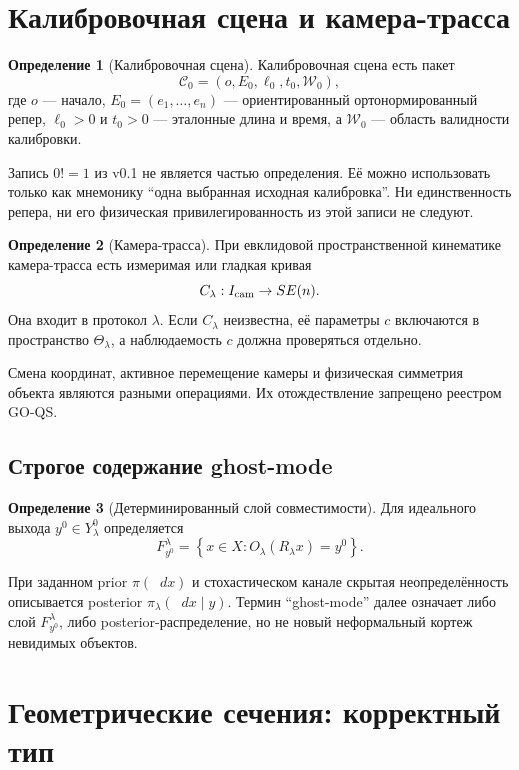 \documentclass[11pt,a4paper]{article}
\theoremstyle{definition}
\newtheorem{definition}{Определение}[section]
\theoremstyle{plain}
\theoremstyle{remark}
\newcommand{\dd}{\mathop{}\!d}
\newcommand{\set}[1]{\left\{#1\right\}}
\begin{document}
\section{Калибровочная сцена и камера-трасса}

\begin{definition}[Калибровочная сцена]
Калибровочная сцена есть пакет
\[
\mathcal C_0=(o,E_0,\ell_0,t_0,\mathcal W_0),
\]
где $o$ --- начало, $E_0=(e_1,\ldots,e_n)$ --- ориентированный
ортонормированный репер, $\ell_0>0$ и $t_0>0$ --- эталонные длина и время,
а $\mathcal W_0$ --- область валидности калибровки.
\end{definition}

Запись $0!=1$ из v0.1 не является частью определения. Её можно использовать
только как мнемонику ``одна выбранная исходная калибровка''. Ни единственность
репера, ни его физическая привилегированность из этой записи не следуют.

\begin{definition}[Камера-трасса]
При евклидовой пространственной кинематике камера-трасса есть измеримая или
гладкая кривая
\[
C_\lambda:I_{\rm cam}\to SE(n).
\]
Она входит в протокол $\lambda$. Если $C_\lambda$ неизвестна, её параметры
$c$ включаются в пространство $\Theta_\lambda$, а наблюдаемость $c$ должна
проверяться отдельно.
\end{definition}

Смена координат, активное перемещение камеры и физическая симметрия объекта
являются разными операциями. Их отождествление запрещено реестром GO-QS.

\subsection{Строгое содержание ghost-mode}

\begin{definition}[Детерминированный слой совместимости]
Для идеального выхода $y^0\in Y_\lambda^0$ определяется
\[
F_{y^0}^{\lambda}
=\set{x\in X:O_\lambda(R_\lambda x)=y^0}.
\]
\end{definition}

При заданном prior $\pi(\dd x)$ и стохастическом канале скрытая
неопределённость описывается posterior $\pi_\lambda(\dd x\mid y)$.
Термин ``ghost-mode'' далее означает либо слой $F_{y^0}^{\lambda}$, либо
posterior-распределение, но не новый неформальный кортеж невидимых объектов.

\section{Геометрические сечения: корректный тип}
\end{document}
